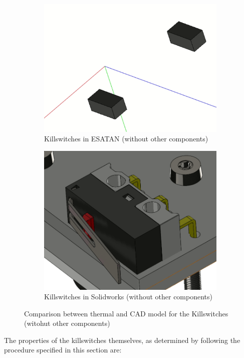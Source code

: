 \begin{figure}[H]
    \centering
    \begin{subfigure}{.5\textwidth}
      \centering
      \includegraphics[width=.6\linewidth]{res/img/5_simulationanalisys/Comparisons/ESATAN/killswitches_raw.PNG}
      \caption{Killswitches in ESATAN (without other components)}
      \label{fig:killswitchesraw}
    \end{subfigure}%
    \begin{subfigure}{.5\textwidth}
      \centering
      \includegraphics[width=.5\linewidth]{res/img/5_simulationanalisys/Comparisons/SLDW/Killswitch_raw_Solid.PNG}
      \caption{Killswitches in Solidworks (without other components)}
      \label{fig:killswitchesrawsolid}
    \end{subfigure}
    \caption{Comparison between thermal and CAD model for the Killswitches (witohut other components)}
    \label{fig:killswitchesrawim}
\end{figure}

The properties of the killswitches themselves, as determined by following the procedure specified in
this section are:

